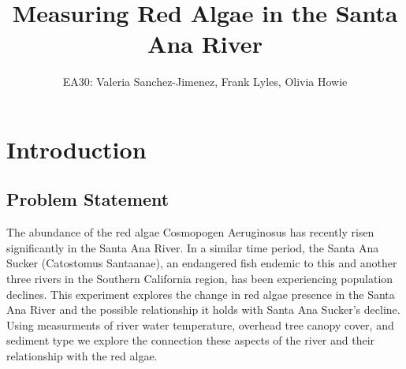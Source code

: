 \documentclass{article}\usepackage[]{graphicx}\usepackage[]{color}
\title{Measuring Red Algae in the Santa Ana River}
\author{EA30: Valeria Sanchez-Jimenez, Frank Lyles, Olivia Howie}
\begin{document}


\maketitle

\newpage
\tableofcontents
\newpage

\section{Introduction}


\subsection{Problem Statement}

The abundance of the red algae Cosmopogen Aeruginosus has recently risen significantly in the Santa Ana River. In a similar time period, the Santa Ana Sucker (Catostomus Santaanae), an endangered fish endemic to this and another three rivers in the Southern California region, has been experiencing population declines. This experiment explores the change in red algae presence in the Santa Ana River and the possible relationship it holds with Santa Ana Sucker's decline. Using measurments of river water temperature, overhead tree canopy cover, and sediment type we explore the connection these aspects of the river and their relationship with the red algae.
\end{document}
